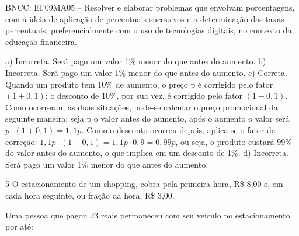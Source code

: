 \begin{escolha}
\begin{boxmedio}
\begin{boxmedio}
{\begin{boxpeq}
\begin{boxpeq}
{\begin{boxpeq}
\begin{boxmedio}
\begin{boxmedio}
\begin{boxpeq}
\begin{boxmedio}
\begin{boxpeq}
\begin{boxpeq}
\begin{boxpeq}
\begin{boxpeq}
\begin{boxmedio}
{\begin{boxmedio}
\begin{boxmedio}
\begin{boxpeq}
\begin{boxmedio}
\begin{boxpeq}
\begin{boxpeq}
\begin{boxpeq}
\begin{escolha}
{\begin{boxmedio}
\begin{boxpeq}
\begin{boxpeq}
\begin{boxpeq}
\begin{boxpeq}
\begin{boxpeq}
\begin{boxmedio}
\begin{boxpeq}
\begin{boxpeq}
\begin{boxpeq}
{\begin{boxpeq}
\begin{boxmedio}
\begin{boxpeq}
\begin{boxpeq}
\begin{boxpeq}
{\begin{boxpeq}
\begin{boxmedio}
{\begin{boxpeq}
\begin{boxpeq}
\begin{boxmedio}
\begin{boxmedio}
\begin{boxpeq}
\begin{boxpeq}
{\begin{boxpeq}
\begin{boxpeq}
\begin{boxpeq}
\begin{boxpeq}
\begin{boxpeq}
\begin{escolha}
\begin{escolha}
{\begin{boxmedio}
\begin{boxpeq}
\begin{q°}
\begin{boxmedio}
\begin{boxpeq}
\begin{boxpeq}
\begin{boxmedio}
\begin{boxmedio}
\begin{boxmedio}
\begin{boxmedio}
{BNCC: EF09MA05 -- Resolver e elaborar problemas que envolvam porcentagens, 
com a ideia de aplicação de percentuais sucessivos e a determinação das taxas
percentuais, preferencialmente com o uso de tecnologias digitais, no
contexto da educação financeira. 

a) Incorreta. Será pago um valor 1\% menor do que antes do aumento.
b) Incorreta. Será pago um valor 1\% menor do que antes do aumento.
c) Correta. Quando um produto tem 10\% de aumento, o preço p é corrigido pelo fator $(1+0,1)$; 
o desconto de 10\%, por sua vez, é corrigido pelo fator $(1-0,1)$. Como ocorreram 
as duas situações, pode-se calcular o preço promocional da seguinte maneira: seja p 
o valor antes do aumento, após o aumento o valor será $p \cdot (1+0,1) = 1,1p$. 
Como o desconto ocorreu depois, aplica-se o fator de correção: $1,1p \cdot (1-0,1) = 1,1p\cdot0,9 = 0,99p$, 
ou seja, o produto custará 99\% do valor antes do aumento, o que implica em um desconto de 1\%.
d) Incorreta. Será pago um valor 1\% menor do que antes do aumento.}

\num{5} O estacionamento de um shopping, cobra pela primeira hora, R\$ 8,00 e, em cada hora seguinte,
ou fração da hora, R\$ 3,00.

Uma pessoa que pagou 23 reais permaneceu com seu veículo no estacionamento por até:

\begin{escolha}
  

\end{escolha}
\end{boxmedio}
\end{boxmedio}
\end{boxmedio}
\end{boxmedio}
\end{boxpeq}
\end{boxpeq}
\end{boxmedio}
\end{q°}
\end{boxpeq}
\end{boxmedio}}
\end{escolha}
\end{escolha}
\end{boxpeq}
\end{boxpeq}
\end{boxpeq}
\end{boxpeq}
\end{boxpeq}}
\end{boxpeq}
\end{boxpeq}
\end{boxmedio}
\end{boxmedio}
\end{boxpeq}
\end{boxpeq}}
\end{boxmedio}
\end{boxpeq}}
\end{boxpeq}
\end{boxpeq}
\end{boxpeq}
\end{boxmedio}
\end{boxpeq}}
\end{boxpeq}
\end{boxpeq}
\end{boxpeq}
\end{boxmedio}
\end{boxpeq}
\end{boxpeq}
\end{boxpeq}
\end{boxpeq}
\end{boxpeq}
\end{boxmedio}}
\end{escolha}
\end{boxpeq}
\end{boxpeq}
\end{boxpeq}
\end{boxmedio}
\end{boxpeq}
\end{boxmedio}
\end{boxmedio}}
\end{boxmedio}
\end{boxpeq}
\end{boxpeq}
\end{boxpeq}
\end{boxpeq}
\end{boxmedio}
\end{boxpeq}
\end{boxmedio}
\end{boxmedio}
\end{boxpeq}}
\end{boxpeq}
\end{boxpeq}}
\end{boxmedio}
\end{boxmedio}
\end{escolha}
